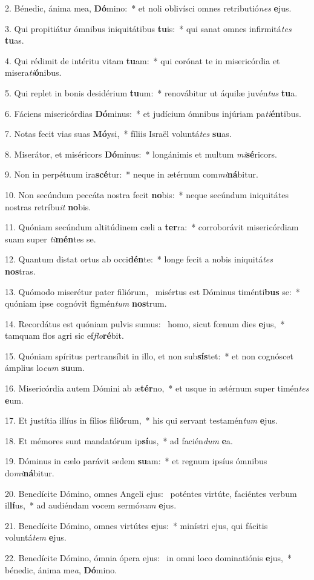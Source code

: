 2. Bénedic, ánima mea, \textbf{Dó}mino:~*  et noli oblivísci omnes retributió\textit{nes} \textbf{e}jus.\

3. Qui propitiátur ómnibus iniquitátibus \textbf{tu}is:~*  qui sanat omnes infirmitá\textit{tes} \textbf{tu}as.\

4. Qui rédimit de intéritu vitam \textbf{tu}am:~*  qui corónat te in misericórdia et misera\textit{ti}\textbf{ó}nibus.\

5. Qui replet in bonis desidérium \textbf{tu}um:~*  renovábitur ut áquilæ juvén\textit{tus} \textbf{tu}a.\

6. Fáciens misericórdias \textbf{Dó}minus:~*  et judícium ómnibus injúriam pa\textit{ti}\textbf{én}tibus.\

7. Notas fecit vias suas \textbf{Mó}ysi,~*  fíliis Israël voluntá\textit{tes} \textbf{su}as.\

8. Miserátor, et miséricors \textbf{Dó}minus:~*  longánimis et multum \textit{mi}\textbf{sé}ricors.\

9. Non in perpétuum ira\textbf{scé}tur:~*  neque in ætérnum com\textit{mi}\textbf{ná}bitur.\

10. Non secúndum peccáta nostra fecit \textbf{no}bis:~*  neque secúndum iniquitátes nostras retríbu\textit{it} \textbf{no}bis.\

11. Quóniam secúndum altitúdinem cæli a \textbf{ter}ra:~*  corroborávit misericórdiam suam super \textit{ti}\textbf{mén}tes se.\

12. Quantum distat ortus ab occi\textbf{dén}te:~*  longe fecit a nobis iniquitá\textit{tes} \textbf{nos}tras.\

13. Quómodo miserétur pater filiórum, \dag\  misértus est Dóminus timénti\textbf{bus} se:~*  quóniam ipse cognóvit figmén\textit{tum} \textbf{nos}trum.\

14. Recordátus est quóniam pulvis sumus: \dag\  homo, sicut fœnum dies \textbf{e}jus,~*  tamquam flos agri sic ef\textit{flo}\textbf{ré}bit.\

15. Quóniam spíritus pertransíbit in illo, et non sub\textbf{sís}tet:~*  et non cognóscet ámplius lo\textit{cum} \textbf{su}um.\

16. Misericórdia autem Dómini ab æ\textbf{tér}no,~*  et usque in ætérnum super timén\textit{tes} \textbf{e}um.\

17. Et justítia illíus in fílios fili\textbf{ó}rum,~*  his qui servant testamén\textit{tum} \textbf{e}jus.\

18. Et mémores sunt mandatórum ip\textbf{sí}us,~*  ad facién\textit{dum} \textbf{e}a.\

19. Dóminus in cælo parávit sedem \textbf{su}am:~*  et regnum ipsíus ómnibus do\textit{mi}\textbf{ná}bitur.\

20. Benedícite Dómino, omnes Angeli ejus: \dag\  poténtes virtúte, faciéntes verbum il\textbf{lí}us,~*  ad audiéndam vocem sermó\textit{num} \textbf{e}jus.\

21. Benedícite Dómino, omnes virtútes \textbf{e}jus:~*  minístri ejus, qui fácitis voluntá\textit{tem} \textbf{e}jus.\

22. Benedícite Dómino, ómnia ópera ejus: \dag\  in omni loco dominatiónis \textbf{e}jus,~*  bénedic, ánima me\textit{a}, \textbf{Dó}mino.\

